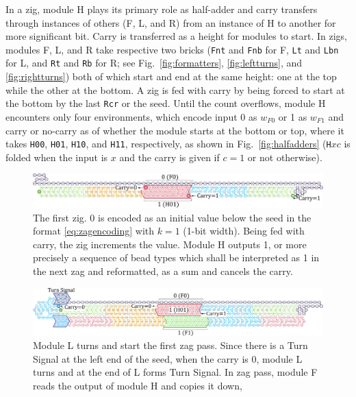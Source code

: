 \documentclass[runningheads]{llncs}
\begin{document}
In a zig, module H plays its primary role as half-adder and carry transfers through instances of others (F, L, and R) from an instance of H to another for more significant bit.
Carry is transferred as a height for modules to start.
In zigs, modules F, L, and R take respective two bricks (\texttt{Fnt} and \texttt{Fnb} for F, \texttt{Lt} and \texttt{Lbn} for L, and \texttt{Rt} and \texttt{Rb} for R; see Fig.~\ref{fig:formatters}, \ref{fig:leftturns}, and \ref{fig:rightturns}) both of which start and end at the same height: one at the top while the other at the bottom.
A zig is fed with carry by being forced to start at the bottom by the last \texttt{Rcr} or the seed.
Until the count overflows, module H encounters only four environments, which encode input 0 as $w_{F0}$ or 1 as $w_{F1}$ and carry or no-carry as of whether the module starts at the bottom or top, where it takes \texttt{H00}, \texttt{H01}, \texttt{H10}, and \texttt{H11}, respectively, as shown in Fig.~\ref{fig:halfadders} (\texttt{H}$xc$ is folded when the input is $x$ and the carry is given if $c=1$ or not otherwise).

\begin{figure}[tb]
\centering
\includegraphics[width=\linewidth]{fig/svg/CounterEx5_1.pdf}
\caption{
The first zig.
0 is encoded as an initial value below the seed in the format \eqref{eq:zagencoding} with $k = 1$ (1-bit width).
Being fed with carry, the zig increments the value.
Module H outputs 1, or more precisely a sequence of bead types which shall be interpreted as 1 in the next zag and reformatted, as a sum and cancels the carry.
}

\label{fig:counter1stzig}
\end{figure}

\begin{figure}[tb]
\centering
\includegraphics[width=\linewidth]{fig/svg/CounterEx11_1.pdf}
\caption{
Module L turns and start the first zag pass.
Since there is a Turn Signal at the left end of the seed, when the carry is 0, module L turns and at the end of L forms Turn Signal.
In zag pass, module F reads the output of module H and copies it down,
}
\label{fig:counter1stzag}
\end{figure}
\end{document}
